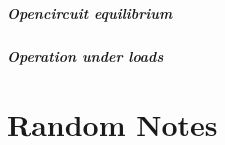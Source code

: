 \documentclass[letterpaper,10pt,english]{jupyterBook}
\begin{document}
\subsubsection{Open\sphinxhyphen{}circuit equilibrium}
\label{\detokenize{ch/batteries-li:open-circuit-equilibrium}}\label{\detokenize{ch/batteries-li:electro-chemical-batteries-li-regimes-open}}

\subsubsection{Operation under loads}
\label{\detokenize{ch/batteries-li:operation-under-loads}}\label{\detokenize{ch/batteries-li:electro-chemical-batteries-li-regimes-load}}
\sphinxstepscope


\part{Random Notes}
\end{document}
